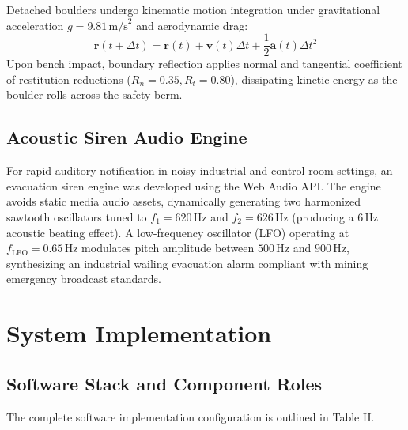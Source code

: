 \documentclass[conference]{IEEEtran}
\begin{document}
Detached boulders undergo kinematic motion integration under gravitational acceleration $g = 9.81\,\text{m/s}^2$ and aerodynamic drag:
\begin{equation}
\mathbf{r}(t + \Delta t) = \mathbf{r}(t) + \mathbf{v}(t)\Delta t + \frac{1}{2}\mathbf{a}(t)\Delta t^2 \label{eq:verlet}
\end{equation}
Upon bench impact, boundary reflection applies normal and tangential coefficient of restitution reductions ($R_n = 0.35, R_t = 0.80$), dissipating kinetic energy as the boulder rolls across the safety berm.

\subsection{Acoustic Siren Audio Engine}
For rapid auditory notification in noisy industrial and control-room settings, an evacuation siren engine was developed using the Web Audio API. The engine avoids static media audio assets, dynamically generating two harmonized sawtooth oscillators tuned to $f_1 = 620\,\text{Hz}$ and $f_2 = 626\,\text{Hz}$ (producing a $6\,\text{Hz}$ acoustic beating effect). A low-frequency oscillator (LFO) operating at $f_{\text{LFO}} = 0.65\,\text{Hz}$ modulates pitch amplitude between $500\,\text{Hz}$ and $900\,\text{Hz}$, synthesizing an industrial wailing evacuation alarm compliant with mining emergency broadcast standards.

\section{System Implementation}

\subsection{Software Stack and Component Roles}
The complete software implementation configuration is outlined in Table II.
\end{document}
